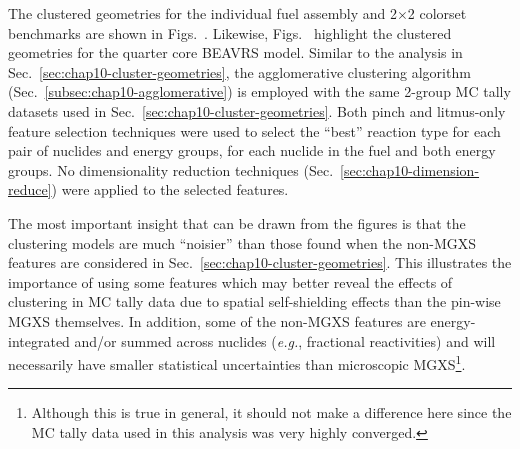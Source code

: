 \begin{appendices}
The clustered geometries for the individual fuel assembly and 2$\times$2 colorset benchmarks are shown in Figs.~. Likewise, Figs.~ highlight the clustered geometries for the quarter core \ac{BEAVRS} model. Similar to the analysis in Sec.~\ref{sec:chap10-cluster-geometries}, the agglomerative clustering algorithm (Sec.~\ref{subsec:chap10-agglomerative}) is employed with the same 2-group \ac{MC} tally datasets used in Sec.~\ref{sec:chap10-cluster-geometries}. Both pinch and litmus-only feature selection techniques were used to select the ``best'' reaction type for each pair of nuclides and energy groups, for each nuclide in the fuel and both energy groups. No dimensionality reduction techniques (Sec.~\ref{sec:chap10-dimension-reduce}) were applied to the selected features.

The most important insight that can be drawn from the figures is that the clustering models are much ``noisier'' than those found when the non-\ac{MGXS} features are considered in Sec.~\ref{sec:chap10-cluster-geometries}. This illustrates the importance of using some features which may better reveal the effects of clustering in \ac{MC} tally data due to spatial self-shielding effects than the pin-wise \ac{MGXS} themselves. In addition, some of the non-\ac{MGXS} features are energy-integrated and/or summed across nuclides (\textit{e.g.}, fractional reactivities) and will necessarily have smaller statistical uncertainties than microscopic \ac{MGXS}\footnote{Although this is true in general, it should not make a difference here since the \ac{MC} tally data used in this analysis was very highly converged.}.


\end{appendices}

